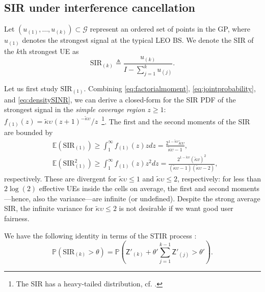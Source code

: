 \documentclass[lettersize,journal]{IEEEtran}
\begin{document}
\subsection{SIR under interference cancellation}



Let $(u_{(1)}, \dots, u_{(k)}) \subset \mathcal{G}$ represent an ordered set of points in the GP, where $u_{(1)}$ denotes the strongest signal at the typical LEO BS. We denote the SIR of the $k$th strongest UE as
\begin{equation}
  \label{eq:IC-SINR}
  \text{SIR}_{(k)} \triangleq \frac{u_{(k)}}{I-\sum_{j =1}^k u_{(j)}}.
\end{equation}


Let us first study $\text{SIR}_{(1)}$. Combining \eqref{eq:factorialmoment}, \eqref{eq:jointprobability}, and \eqref{eq:densitySINR}, we can derive a closed-form for the SIR PDF of the strongest signal in the \textit{simple coverage region} $z\geq 1$: $f_{(1)}(z) =  {\tilde{\kappa}\upsilon_{}\left({z + 1} \right)^{-\tilde{\kappa}\upsilon_{}}}/{z}$~\footnote{The SIR has a heavy-tailed distribution, cf. \cite[Eq. (32)]{10909705}.}. The first and the second moments of the SIR are bounded by
\begin{align}
  \label{eq:SIR1}
  &\mathbb{E}(\text{SIR}_{(1)}) \geq \int_{1}^{\infty}f_{(1)}(z) z dz=\frac{  2^{1-\tilde{\kappa} \upsilon } \tilde{\kappa} \upsilon }{\tilde{\kappa} \upsilon -1}, \\
&\mathbb{E}(\text{SIR}^2_{(1)}) \geq \int_{1}^{\infty}f_{(1)}(z) z^2 dz = \frac{2^{1-\tilde{\kappa}v}(\tilde{\kappa}v)^2}{(\tilde{\kappa}\upsilon-1)(\tilde{\kappa}\upsilon-2)},  \label{eq:SIR2}
\end{align}
respectively. These are divergent for $\tilde{\kappa}\upsilon \leq 1$ and $\tilde{\kappa}\upsilon \leq 2$, respectively: for less than $2\log(2)$ effective UEs inside the cells on average, the first and second moments---hence, also the variance---are infinite (or undefined). Despite the strong average SIR, the infinite variance for $\tilde{\kappa}\upsilon \leq 2$ is not desirable if we want good user fairness. 


We have the following identity in terms of the STIR process \cite[Eq. (69)]{7305791}:
\begin{equation}
  \label{eq:identityintermsoftheSTIR}
   \mathbb{P}(\text{SIR}_{(k)} > \theta) = \mathbb{P}\left(\mathsf{Z}'_{(k)}+\theta'\sum_{j=1}^{k-1}\mathsf{Z}'_{(j)} > \theta'\right).
\end{equation}
\end{document}
